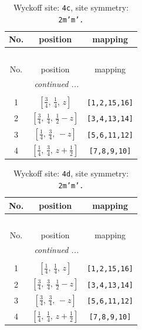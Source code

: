 \documentclass[fleqn,8pt]{jsarticle}
\begin{document}
\renewcommand{\arraystretch}{1.2}
\begin{longtable}{ccc}
\caption{Wyckoff site: {\tt 4c}, site symmetry: {\tt 2m'm'.}}
 \\
 \hline \hline
No. & position & mapping \\ \hline \endfirsthead

\multicolumn{2}{l}{\tablename\ \thetable{}} \\
 \hline \hline
No. & position & mapping \\ \hline \endhead

 \hline \hline
\multicolumn{2}{r}{\footnotesize\it continued ...} \\ \endfoot

 \hline \hline
\multicolumn{2}{r}{} \\ \endlastfoot

1 & $\left[ \frac{3}{4},\, \frac{1}{4},\, z \right]$ & {\tt [1,2,15,16]} \\ \hline
2 & $\left[ \frac{3}{4},\, \frac{1}{4},\, \frac{1}{2} - z \right]$ & {\tt [3,4,13,14]} \\ \hline
3 & $\left[ \frac{1}{4},\, \frac{3}{4},\, - z \right]$ & {\tt [5,6,11,12]} \\ \hline
4 & $\left[ \frac{1}{4},\, \frac{3}{4},\, z + \frac{1}{2} \right]$ & {\tt [7,8,9,10]} \\
\end{longtable}
\renewcommand{\arraystretch}{1.2}
\begin{longtable}{ccc}
\caption{Wyckoff site: {\tt 4d}, site symmetry: {\tt 2m'm'.}}
 \\
 \hline \hline
No. & position & mapping \\ \hline \endfirsthead

\multicolumn{2}{l}{\tablename\ \thetable{}} \\
 \hline \hline
No. & position & mapping \\ \hline \endhead

 \hline \hline
\multicolumn{2}{r}{\footnotesize\it continued ...} \\ \endfoot

 \hline \hline
\multicolumn{2}{r}{} \\ \endlastfoot

1 & $\left[ \frac{1}{4},\, \frac{1}{4},\, z \right]$ & {\tt [1,2,15,16]} \\ \hline
2 & $\left[ \frac{3}{4},\, \frac{3}{4},\, \frac{1}{2} - z \right]$ & {\tt [3,4,13,14]} \\ \hline
3 & $\left[ \frac{3}{4},\, \frac{3}{4},\, - z \right]$ & {\tt [5,6,11,12]} \\ \hline
4 & $\left[ \frac{1}{4},\, \frac{1}{4},\, z + \frac{1}{2} \right]$ & {\tt [7,8,9,10]} \\
\end{longtable}
\end{document}
